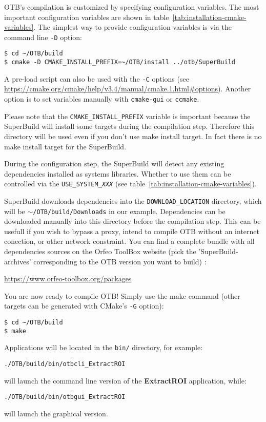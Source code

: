 OTB's compilation is customized by specifying configuration variables.
The most important configuration variables are shown in table~\ref{tab:installation-cmake-variables}.
The simplest way to provide configuration variables is via the command line \texttt{-D} option:
\begin{verbatim}
$ cd ~/OTB/build
$ cmake -D CMAKE_INSTALL_PREFIX=~/OTB/install ../otb/SuperBuild
\end{verbatim}
A pre-load script can also be used with the \texttt{-C} options (see
\url{https://cmake.org/cmake/help/v3.4/manual/cmake.1.html#options}).
Another option is to set variables manually with \texttt{cmake-gui} or \texttt{ccmake}.

Please note that the \texttt{CMAKE\_INSTALL\_PREFIX} variable is important
because the SuperBuild will install some targets during the compilation step.
Therefore this directory will be used even if you don't use make install target.
In fact there is no make install target for the SuperBuild.

During the configuration step, the SuperBuild will detect any existing dependencies installed as systems libraries.
Whether to use them can be controlled via the \texttt{USE\_SYSTEM\_\textit{XXX}} (see
table~\ref{tab:installation-cmake-variables}).

SuperBuild downloads dependencies into the \texttt{DOWNLOAD\_LOCATION} directory, which will be
\texttt{$\sim$/OTB/build/Downloads} in our example.
Dependencies can be downloaded manually into this directory before the compilation step.
This can be usefull if you wish to bypass a proxy, intend to compile OTB without an internet conection, or other network
constraint. You can find a complete bundle with all dependencies sources on the Orfeo ToolBox website (pick the 'SuperBuild-archives' corresponding to the OTB version you want to build) :
\begin{center}
\url{https://www.orfeo-toolbox.org/packages}
\end{center}

You are now ready to compile OTB!
Simply use the make command (other targets can be generated with CMake's \texttt{-G} option):
\begin{verbatim}
$ cd ~/OTB/build
$ make
\end{verbatim}

Applications will be located in the \texttt{bin/} directory, for example:
\begin{verbatim}
./OTB/build/bin/otbcli_ExtractROI
\end{verbatim}
will launch the command line version of the \textbf{ExtractROI} application,
while:
\begin{verbatim}
./OTB/build/bin/otbgui_ExtractROI
\end{verbatim}
will launch the graphical version.


